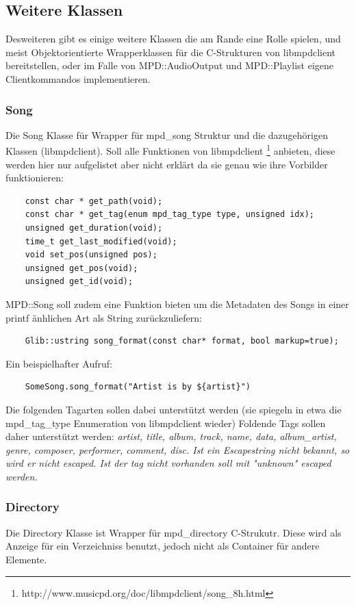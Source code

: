 \subsection{Weitere Klassen}
Desweiteren gibt es einige weitere Klassen die am Rande eine Rolle spielen,
und meist Objektorientierte Wrapperklassen für die C-Strukturen von libmpdclient bereitstellen,
oder im Falle von MPD::AudioOutput und MPD::Playlist eigene Clientkommandos implementieren.

\subsubsection{Song}

Die Song Klasse für Wrapper für mpd\_song Struktur und die dazugehörigen Klassen (libmpdclient).
Soll alle Funktionen von libmpdclient \footnote{http://www.musicpd.org/doc/libmpdclient/song\_8h.html} anbieten,
diese werden hier nur aufgelistet aber nicht erklärt da sie genau wie ihre Vorbilder funktionieren:

\begin{verbatim}
    const char * get_path(void);
    const char * get_tag(enum mpd_tag_type type, unsigned idx);
    unsigned get_duration(void);
    time_t get_last_modified(void);
    void set_pos(unsigned pos);
    unsigned get_pos(void);
    unsigned get_id(void);
\end{verbatim}

MPD::Song soll zudem eine Funktion bieten um die Metadaten des Songs in einer printf änhlichen Art als String zurückzuliefern:
\begin{verbatim}
    Glib::ustring song_format(const char* format, bool markup=true);
\end{verbatim}

Ein beispielhafter Aufruf:
\begin{verbatim}
    SomeSong.song_format("Artist is by ${artist}") 
\end{verbatim}

Die folgenden Tagarten sollen dabei unterstützt werden (sie spiegeln in etwa die mpd\_tag\_type Enumeration von libmpdclient wieder)
Foldende Tags sollen daher unterstützt werden: \it artist, title, album, track, name, data, album\_artist, genre, composer, performer, comment, disc\rm.
Ist ein Escapestring nicht bekannt, so wird er nicht escaped. Ist der tag nicht vorhanden soll mit "unknown" escaped werden.


\subsubsection{Directory}
Die Directory Klasse ist Wrapper für mpd\_directory C-Strukutr. Diese wird als Anzeige für ein Verzeichniss benutzt,
jedoch nicht als Container für andere Elemente.

